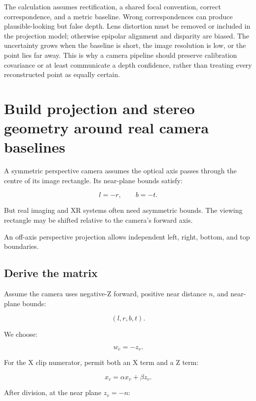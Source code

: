 The calculation assumes rectification, a shared focal convention, correct correspondence, and a metric baseline. Wrong correspondences can produce plausible-looking but false depth. Lens distortion must be removed or included in the projection model; otherwise epipolar alignment and disparity are biased. The uncertainty grows when the baseline is short, the image resolution is low, or the point lies far away. This is why a camera pipeline should preserve calibration covariance or at least communicate a depth confidence, rather than treating every reconstructed point as equally certain.

\section{Build projection and stereo geometry around real camera baselines}\label{02-foundations-ii-ch035-build-projection-and-stereo-geometry-around-real-camera-baselines}

\hypertarget{02-foundations-ii-ch035-build-projection-and-stereo-geometry-around-real-camera-baselines}{}

A symmetric perspective camera assumes the optical axis passes through the centre of its image rectangle. Its near-plane bounds satisfy:

\[ l=-r,\qquad b=-t. \]

But real imaging and XR systems often need asymmetric bounds. The viewing rectangle may be shifted relative to the camera's forward axis.

An off-axis perspective projection allows independent left, right, bottom, and top boundaries.

\subsection{Derive the matrix}\label{02-foundations-ii-ch035-derive-the-matrix}

\hypertarget{02-foundations-ii-ch035-derive-the-matrix}{}

Assume the camera uses negative-Z forward, positive near distance \(n\), and near-plane bounds:

\[ (l,r,b,t). \]

We choose:

\[ w_c=-z_v. \]

For the X clip numerator, permit both an X term and a Z term:

\[ x_c=\alpha x_v+\beta z_v. \]

After division, at the near plane \(z_v=-n\):

